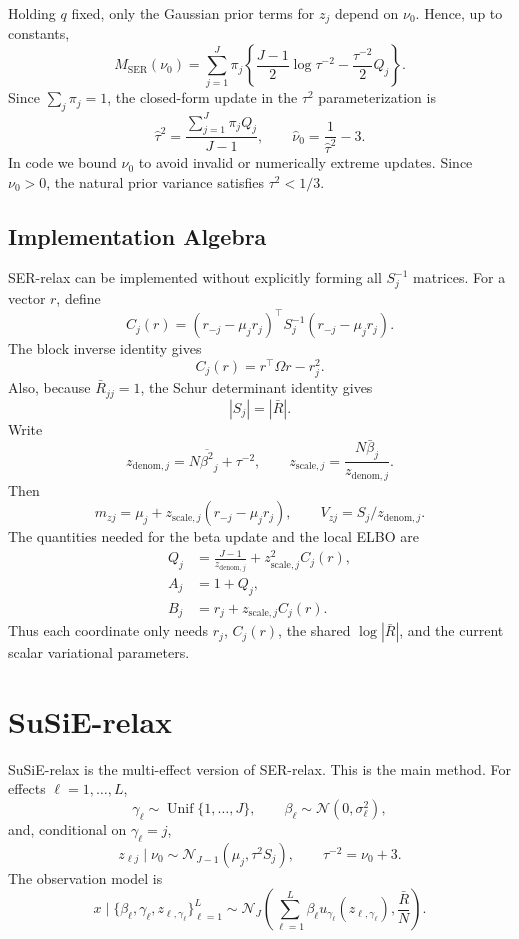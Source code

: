 \documentclass[11pt]{article}
\newcommand{\Rbar}{\bar R}
\newcommand{\Om}{\Omega}
\newcommand{\Unif}{\operatorname{Unif}}
\newcommand{\Normal}{\mathcal N}
\begin{document}
Holding \(q\) fixed, only the Gaussian prior terms for \(z_j\) depend on
\(\nu_0\). Hence, up to constants,
\[
M_{\mathrm{SER}}(\nu_0)
=
\sum_{j=1}^J
\pi_j
\left\{
\frac{J-1}{2}\log\tau^{-2}
-\frac{\tau^{-2}}{2}Q_j
\right\}.
\]
Since \(\sum_j\pi_j=1\), the closed-form update in the \(\tau^2\)
parameterization is
\[
\hat\tau^2
=
\frac{\sum_{j=1}^J\pi_jQ_j}{J-1},
\qquad
\hat\nu_0=\frac{1}{\hat\tau^2}-3.
\]
In code we bound \(\nu_0\) to avoid invalid or numerically extreme
updates. Since \(\nu_0>0\), the natural prior variance satisfies
\(\tau^2<1/3\).

\subsection{Implementation Algebra}

SER-relax can be implemented without explicitly forming all
\(S_j^{-1}\) matrices. For a vector \(r\), define
\[
C_j(r)
=
(r_{-j}-\mu_jr_j)^\top S_j^{-1}(r_{-j}-\mu_jr_j).
\]
The block inverse identity gives
\[
C_j(r)=r^\top\Om r-r_j^2.
\]
Also, because \(\Rbar_{jj}=1\), the Schur determinant identity gives
\[
|S_j|=|\Rbar|.
\]
Write
\[
z_{\mathrm{denom},j}
=
N\overline{\beta^2}_j+\tau^{-2},
\qquad
z_{\mathrm{scale},j}
=
\frac{N\bar\beta_j}{z_{\mathrm{denom},j}}.
\]
Then
\[
m_{zj}=\mu_j+z_{\mathrm{scale},j}(r_{-j}-\mu_jr_j),
\qquad
V_{zj}=S_j/z_{\mathrm{denom},j}.
\]
The quantities needed for the beta update and the local ELBO are
\begin{align}
Q_j
&=
\frac{J-1}{z_{\mathrm{denom},j}}
+z_{\mathrm{scale},j}^2C_j(r),\\
A_j&=1+Q_j,\\
B_j&=r_j+z_{\mathrm{scale},j}C_j(r).
\end{align}
Thus each coordinate only needs \(r_j\), \(C_j(r)\), the shared
\(\log|\Rbar|\), and the current scalar variational parameters.

\section{SuSiE-relax}

SuSiE-relax is the multi-effect version of SER-relax. This is the main
method. For effects \(\ell=1,\ldots,L\),
\[
\gamma_\ell\sim\Unif\{1,\ldots,J\},\qquad
\beta_\ell\sim\Normal(0,\sigma_\ell^2),
\]
and, conditional on \(\gamma_\ell=j\),
\[
z_{\ell j}\mid\nu_0
\sim
\Normal_{J-1}(\mu_j,\tau^2S_j),
\qquad
\tau^{-2}=\nu_0+3.
\]
The observation model is
\[
x\mid\{\beta_\ell,\gamma_\ell,z_{\ell,\gamma_\ell}\}_{\ell=1}^L
\sim
\Normal_J
\left(
\sum_{\ell=1}^L
\beta_\ell u_{\gamma_\ell}(z_{\ell,\gamma_\ell}),
\frac{\Rbar}{N}
\right).
\]
\end{document}
